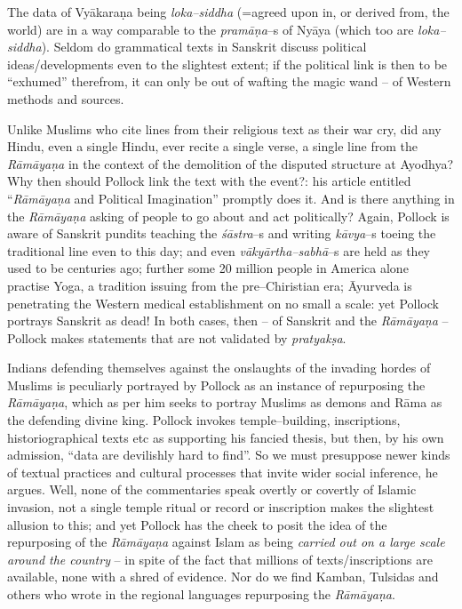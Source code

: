 The data of Vyākaraṇa being \textit{loka–siddha} (=agreed upon in, or derived from, the world) are in a way comparable to the \textit{pramāṇa}–s of Nyāya (which too are \textit{loka–siddha}). Seldom do grammatical texts in Sanskrit discuss political ideas/developments even to the slightest extent; if the political link is then to be “exhumed” therefrom, it can only be out of wafting the magic wand – of Western methods and sources.

Unlike Muslims who cite lines from their religious text as their war cry, did any Hindu, even a single Hindu, ever recite a single verse, a single line from the \textit{Rāmāyaṇa} in the context of the demolition of the disputed structure at Ayodhya? Why then should Pollock link the text with the event?: his article entitled “\textit{Rāmāyaṇa} and Political Imagination” promptly does it. And is there anything in the \textit{Rāmāyaṇa} asking of people to go about and act politically? Again, Pollock is aware of Sanskrit pundits teaching the \textit{śāstra}–s and writing \textit{kāvya}–s toeing the traditional line even to this day; and even \textit{vākyārtha–sabhā}–s are held as they used to be centuries ago; further some 20 million people in America alone practise Yoga, a tradition issuing from the pre–Chiristian era; Āyurveda is penetrating the Western medical establishment on no small a scale: yet Pollock portrays Sanskrit as dead! In both cases, then – of Sanskrit and the \textit{Rāmāyaṇa} – Pollock makes statements that are not validated by \textit{pratyakṣa}.

Indians defending themselves against the onslaughts of the invading hordes of Muslims is peculiarly portrayed by Pollock as an instance of repurposing the \textit{Rāmāyaṇa}, which as per him seeks to portray Muslims as demons and Rāma as the defending divine king. Pollock invokes temple–building, inscriptions, historiographical texts etc as supporting his fancied thesis, but then, by his own admission, “data are devilishly hard to find”. So we must presuppose newer kinds of textual practices and cultural processes that invite wider social inference, he argues. Well, none of the commentaries speak overtly or covertly of Islamic invasion, not a single temple ritual or record or inscription makes the slightest allusion to this; and yet Pollock has the cheek to posit the idea of the repurposing of the \textit{Rāmāyaṇa} against Islam as being \textit{carried out on a large scale around the country} – in spite of the fact that millions of texts/inscriptions are available, none with a shred of evidence. Nor do we find Kamban, Tulsidas and others who wrote in the regional languages repurposing the \textit{Rāmāyaṇa}.

